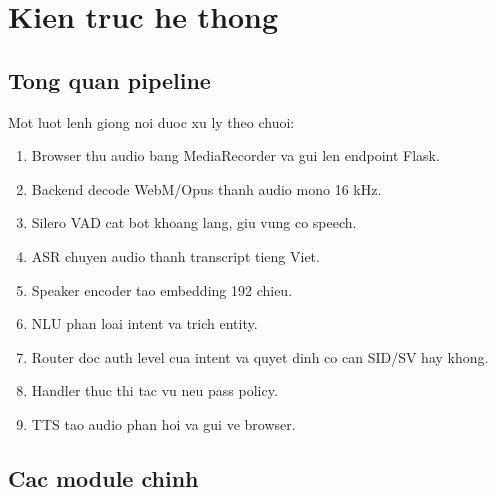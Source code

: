 \documentclass[12pt,a4paper]{article}
\begin{document}
\section{Kien truc he thong}

\subsection{Tong quan pipeline}

Mot luot lenh giong noi duoc xu ly theo chuoi:

\begin{enumerate}
  \item Browser thu audio bang MediaRecorder va gui len endpoint Flask.
  \item Backend decode WebM/Opus thanh audio mono 16 kHz.
  \item Silero VAD cat bot khoang lang, giu vung co speech.
  \item ASR chuyen audio thanh transcript tieng Viet.
  \item Speaker encoder tao embedding 192 chieu.
  \item NLU phan loai intent va trich entity.
  \item Router doc auth level cua intent va quyet dinh co can SID/SV hay khong.
  \item Handler thuc thi tac vu neu pass policy.
  \item TTS tao audio phan hoi va gui ve browser.
\end{enumerate}

\subsection{Cac module chinh}
\end{document}
